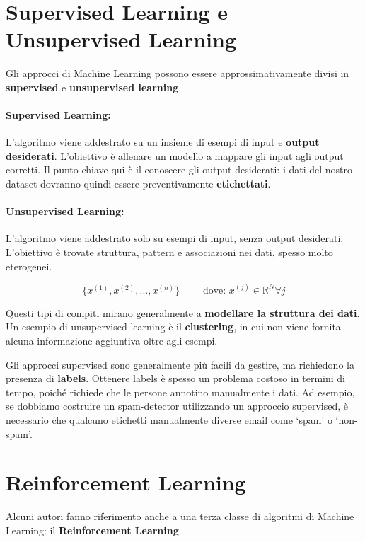 \newpage
\section{Supervised Learning e Unsupervised Learning}

Gli approcci di Machine Learning possono essere approssimativamente divisi in \textbf{supervised} e \textbf{unsupervised learning}.

\paragraph{Supervised Learning:} L'algoritmo viene addestrato su un insieme di esempi di input e \textbf{output desiderati}. L'obiettivo è allenare un modello a mappare gli input agli output corretti. Il punto chiave qui è il conoscere gli output desiderati: i dati del nostro dataset dovranno quindi essere preventivamente \textbf{etichettati}.

\paragraph{Unsupervised Learning:} L'algoritmo viene addestrato solo su esempi di input, senza output desiderati. L'obiettivo è trovate struttura, pattern e associazioni nei dati, spesso molto eterogenei.

$$ 
\{x^{(1)}, x^{(2)}, ..., x^{(n)}\} \qquad \text{ dove: } x^{(j)} \in \mathbb{R}^{N} \forall j
$$

Questi tipi di compiti mirano generalmente a \textbf{modellare la struttura dei dati}. Un esempio di unsupervised learning è il \textbf{clustering}, in cui non viene fornita alcuna informazione aggiuntiva oltre agli esempi.

Gli approcci supervised sono generalmente più facili da gestire, ma richiedono la presenza di \textbf{labels}. Ottenere labels è spesso un problema costoso in termini di tempo, poiché richiede che le persone annotino manualmente i dati. Ad esempio, se dobbiamo costruire un spam-detector utilizzando un approccio supervised, è necessario che qualcuno etichetti manualmente diverse email come ‘spam’ o ‘non-spam’.

\newpage

\section{Reinforcement Learning}

Alcuni autori fanno riferimento anche a una terza classe di algoritmi di Machine Learning: il \textbf{Reinforcement Learning}.

